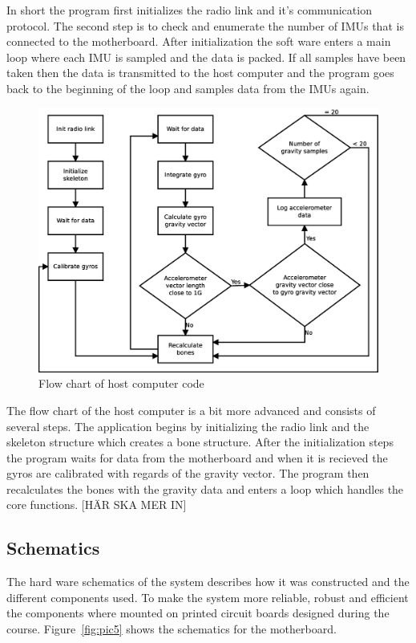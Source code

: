 \documentclass[a4paper, 12pt]{article}
\begin{document}
In short the program first initializes the radio link and it's communication protocol. The second step is to check and enumerate the number of IMUs that is connected to the motherboard. After initialization the soft ware enters a main loop where each IMU is sampled and the data is packed. If all samples have been taken then the data is transmitted to the host computer and the program goes back to the beginning of the loop and samples data from the IMUs again.    

 
\begin{figure}[h!] %
    \centering
    \includegraphics[scale=0.38]{pi.eps}
    \caption{Flow chart of host computer code}
    \label{fig:pic4}
\end{figure}

The flow chart of the host computer is a bit more advanced and consists of several steps. The application begins by initializing the radio link and the skeleton structure which creates a bone structure. After the initialization steps the program waits for data from the motherboard and when it is recieved the gyros are calibrated with regards of the gravity vector. The program then recalculates the bones with the gravity data and enters a loop which handles the core functions.
[HÄR SKA MER IN]

\subsection*{Schematics} %
The hard ware schematics of the system describes how it was constructed and the different components used. To make the system more reliable, robust and efficient the components where mounted on printed circuit boards designed during the course. Figure~\ref{fig:pic5} shows the schematics for the motherboard.
 
\end{document}

